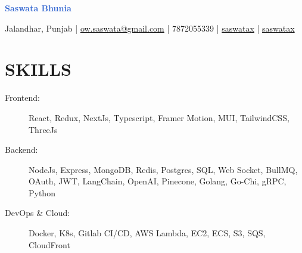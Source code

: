 \documentclass[]{resume}
\begin{document}
\textrm{\Huge\textcolor{highlight}{\textbf{Saswata Bhunia}}}
\vspace{.4em}

Jalandhar, Punjab | \href{mailto:ow.saswata@gmail.com}{ow.saswata@gmail.com} | 7872055339 | \href{https://www.linkedin.com/in/saswatax}{\faLinkedin \space saswatax} | \href{https://github.com/saswatax}{\faGithub \space saswatax}
\vspace{.4em}


\section{SKILLS}
\begin{description}
  \item[Frontend:] React, Redux, NextJs, Typescript, Framer Motion, MUI, TailwindCSS, ThreeJs 
  \item[Backend:] NodeJs, Express, MongoDB, Redis, Postgres, SQL, Web Socket, BullMQ, OAuth, JWT, LangChain, OpenAI, Pinecone, Golang, Go-Chi, gRPC, Python
  \item[DevOps \& Cloud:] Docker, K8s, Gitlab CI/CD, AWS Lambda, EC2, ECS, S3, SQS, CloudFront
\end{description}
\end{document}
